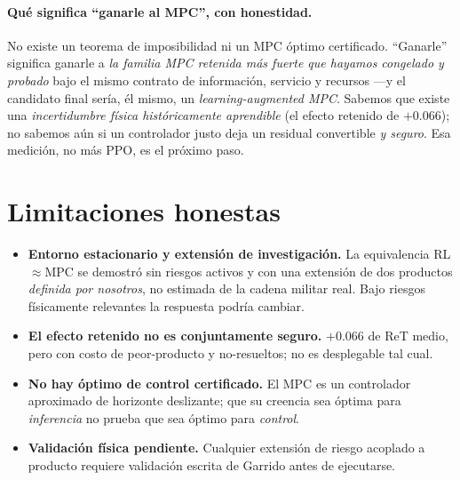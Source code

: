\documentclass[11pt,a4paper]{article}
\begin{document}
\paragraph{Qué significa ``ganarle al MPC'', con honestidad.} No existe un teorema de imposibilidad ni
un MPC óptimo certificado. ``Ganarle'' significa ganarle a \emph{la familia MPC retenida más fuerte que
hayamos congelado y probado} bajo el mismo contrato de información, servicio y recursos —y el candidato
final sería, él mismo, un \emph{learning-augmented MPC}. Sabemos que existe una \emph{incertidumbre
física históricamente aprendible} (el efecto retenido de $+0.066$); no sabemos aún si un controlador
justo deja un residual convertible \emph{y seguro}. Esa medición, no más PPO, es el próximo paso.

\section{Limitaciones honestas}\label{sec:limitaciones}
\begin{itemize}[nosep]
  \item \textbf{Entorno estacionario y extensión de investigación.} La equivalencia RL${\approx}$MPC se
        demostró sin riesgos activos y con una extensión de dos productos \emph{definida por nosotros},
        no estimada de la cadena militar real. Bajo riesgos físicamente relevantes la respuesta podría
        cambiar.
  \item \textbf{El efecto retenido no es conjuntamente seguro.} $+0.066$ de ReT medio, pero con costo
        de peor-producto y no-resueltos; no es desplegable tal cual.
  \item \textbf{No hay óptimo de control certificado.} El MPC es un controlador aproximado de horizonte
        deslizante; que su creencia sea óptima para \emph{inferencia} no prueba que sea óptimo para
        \emph{control}.
  \item \textbf{Validación física pendiente.} Cualquier extensión de riesgo acoplado a producto
        requiere validación escrita de Garrido antes de ejecutarse.
\end{itemize}

\end{document}
